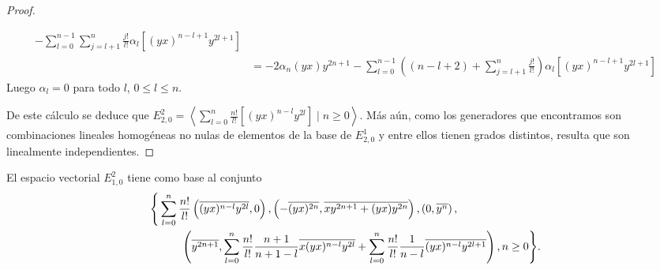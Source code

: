 \documentclass[fleqn,../tesis.tex]{subfiles}
\begin{document}
\begin{proof}
\begin{itemize}
\begin{align*}
                -\sum_{l = 0}^{n - 1}\sum_{j = l + 1}^{n}\frac{j!}{l!}\alpha_l\left[(yx)^{n - l + 1}y^{2l + 1}\right]\\
            &= -2\alpha_n (yx)y^{2n + 1}
                - \sum_{l = 0}^{n - 1}\left((n - l + 2) + \sum_{j = l + 1}^{n}\frac{j!}{l!}\right)\alpha_l\left[(yx)^{n - l + 1}y^{2l + 1}\right]
        \end{align*}
        Luego $\alpha_l = 0$ para todo $l$, $0 \leq l \leq n$.
    \end{itemize}
    De este cálculo se deduce que
        $E^{2}_{2, 0} = \left\langle \sum_{l = 0}^n \frac{n!}{l!}\left[(yx)^{n - l}y^{2l}\right] \mid n \geq 0 \right\rangle$.
    Más aún, como los generadores que encontramos son combinaciones lineales homogéneas no nulas de elementos de la base de $E^{1}_{2, 0}$
    y entre ellos tienen grados distintos, resulta que son linealmente independientes.
\end{proof}
\begin{prop}
    El espacio vectorial $E_{1, 0}^{2}$ tiene como base al conjunto
    \begin{align*}
    \Bigg\lbrace &\sum_{l = 0}^n \frac{n!}{l!}\left(\overline{(yx)^{n - l}y^{2l}}, 0\right), 
        \left(-\overline{(yx)^{2n}}, \overline{xy^{2n + 1} + (yx)y^{2n}}\right), \left(0, \overline{y^{n}}\right),\\
        &\qquad \left(\overline{y^{2n + 1}}, \sum_{l = 0}^n \frac{n!}{l!}\frac{n + 1}{n + 1 - l}\overline{x(yx)^{n - l}y^{2l}} 
            + \sum_{l = 0}^n \frac{n!}{l!}\frac{1}{n - l}\overline{(yx)^{n - l}y^{2l + 1}} \right), n \geq 0 \Bigg\rbrace.
    \end{align*}
\end{prop}
\end{document}
